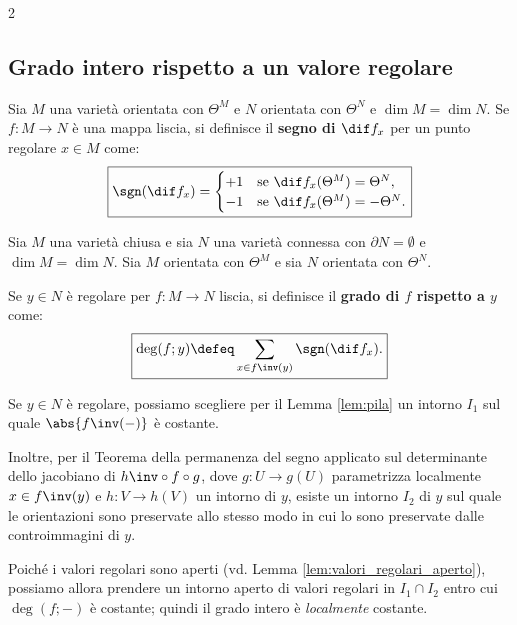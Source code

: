 \begin{multicols*}{2}
    \subsection{Grado intero rispetto a un valore regolare}

    \begin{definition}
        Sia $M$ una varietà orientata con $\Theta^M$ e $N$ orientata
        con $\Theta^N$ e $\dim M = \dim N$. Se $f : M \to N$ è una mappa liscia, si definisce
        il \textbf{segno di $\dif f_x$} per un punto regolare $x \in M$ come:
        \[
            \boxed{\sgn(\dif f_x) = \begin{cases}
                    +1 & \text{se } \dif f_x(\Theta^M) = \Theta^N,  \\
                    -1 & \text{se } \dif f_x(\Theta^M) = -\Theta^N.
                \end{cases}}
        \]
    \end{definition}

    \begin{definition}
        Sia $M$ una varietà chiusa e sia $N$ una varietà connessa con $\partial N = \emptyset$
        e $\dim M = \dim N$. Sia $M$ orientata con $\Theta^M$ e sia $N$ orientata con $\Theta^N$. \smallskip

        Se $y \in N$ è regolare per $f : M \to N$ liscia, si definisce il \textbf{grado di $f$ rispetto a $y$} come:
        \[
            \boxed{\deg(f; y) \defeq \sum_{x \in f\inv(y)} \sgn(\dif f_x).}
        \]
    \end{definition}

    \begin{remark} \label{rmk:grado_loc_costante}
        Se $y \in N$ è regolare, possiamo scegliere per il Lemma \ref{lem:pila} un intorno $I_1$
        sul quale $\abs{f\inv(-)}$ è costante. \smallskip

        Inoltre, per il Teorema della permanenza del
        segno applicato sul determinante dello jacobiano di $h\inv \circ f \circ g$, dove
        $g : U \to g(U)$ parametrizza localmente $x \in f\inv(y)$ e $h : V \to h(V)$
        un intorno di $y$, esiste un intorno $I_2$ di $y$ sul quale le orientazioni sono
        preservate allo stesso modo in cui lo sono preservate dalle controimmagini di $y$. \smallskip

        Poiché i valori regolari sono aperti (vd. Lemma \ref{lem:valori_regolari_aperto}),
        possiamo allora prendere un intorno aperto di valori regolari
        in $I_1 \cap I_2$ entro cui $\deg(f; -)$ è costante; quindi il grado intero è \textit{localmente}
        costante.
    \end{remark}


\end{multicols*}
